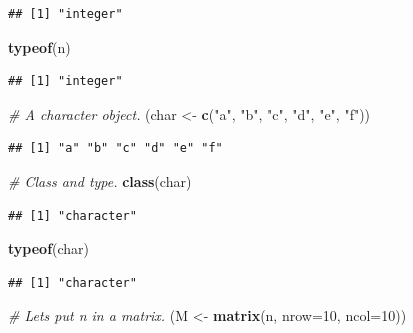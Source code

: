 \documentclass[
]{book}
\newenvironment{Shaded}{\begin{snugshade}}{\end{snugshade}}
\newcommand{\AttributeTok}[1]{\textcolor[rgb]{0.13,0.29,0.53}{#1}}
\newcommand{\CommentTok}[1]{\textcolor[rgb]{0.56,0.35,0.01}{\textit{#1}}}
\newcommand{\DecValTok}[1]{\textcolor[rgb]{0.00,0.00,0.81}{#1}}
\newcommand{\FunctionTok}[1]{\textcolor[rgb]{0.13,0.29,0.53}{\textbf{#1}}}
\newcommand{\NormalTok}[1]{#1}
\newcommand{\OtherTok}[1]{\textcolor[rgb]{0.56,0.35,0.01}{#1}}
\newcommand{\StringTok}[1]{\textcolor[rgb]{0.31,0.60,0.02}{#1}}
\begin{document}
\begin{verbatim}
## [1] "integer"
\end{verbatim}

\begin{Shaded}
\begin{Highlighting}[]
\FunctionTok{typeof}\NormalTok{(n)}
\end{Highlighting}
\end{Shaded}

\begin{verbatim}
## [1] "integer"
\end{verbatim}

\begin{Shaded}
\begin{Highlighting}[]
\CommentTok{\# A character object.}
\NormalTok{(char }\OtherTok{\textless{}{-}} \FunctionTok{c}\NormalTok{(}\StringTok{"a"}\NormalTok{, }\StringTok{"b"}\NormalTok{, }\StringTok{"c"}\NormalTok{, }\StringTok{"d"}\NormalTok{, }\StringTok{"e"}\NormalTok{, }\StringTok{"f"}\NormalTok{))}
\end{Highlighting}
\end{Shaded}

\begin{verbatim}
## [1] "a" "b" "c" "d" "e" "f"
\end{verbatim}

\begin{Shaded}
\begin{Highlighting}[]
\CommentTok{\# Class and type.}
\FunctionTok{class}\NormalTok{(char)}
\end{Highlighting}
\end{Shaded}

\begin{verbatim}
## [1] "character"
\end{verbatim}

\begin{Shaded}
\begin{Highlighting}[]
\FunctionTok{typeof}\NormalTok{(char)}
\end{Highlighting}
\end{Shaded}

\begin{verbatim}
## [1] "character"
\end{verbatim}

\begin{Shaded}
\begin{Highlighting}[]
\CommentTok{\# Let\textquotesingle{}s put n in a matrix.}
\NormalTok{(M }\OtherTok{\textless{}{-}} \FunctionTok{matrix}\NormalTok{(n, }\AttributeTok{nrow=}\DecValTok{10}\NormalTok{, }\AttributeTok{ncol=}\DecValTok{10}\NormalTok{))}
\end{Highlighting}
\end{Shaded}
\end{document}
